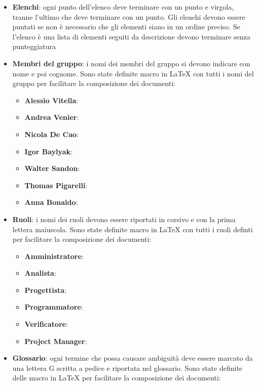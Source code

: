 \documentclass[12pt,a4paper]{article}
\begin{document}
\begin{itemize}
  \item \textbf{Elenchi}: ogni punto dell'elenco deve terminare con un punto e virgola, tranne l'ultimo che deve terminare con un punto. Gli elenchi devono essere puntati se non è necessario che gli elementi siano in un ordine preciso. Se l'elenco è una lista di elementi seguiti da descrizione devono terminare senza punteggiatura
  \item \textbf{Membri del gruppo}: i nomi dei membri del gruppo si devono indicare con nome e poi cognome. Sono state definite macro in \LaTeX{} con tutti i nomi del gruppo per facilitare la composizione dei documenti:
  \begin{itemize}
    \item \textbf{Alessio Vitella}: 
    \item \textbf{Andrea Venier}: 
    \item \textbf{Nicola De Cao}: 
    \item \textbf{Igor Baylyak}: 
    \item \textbf{Walter Sandon}: 
    \item \textbf{Thomas Pigarelli}: 
    \item \textbf{Anna Bonaldo}: 
  \end{itemize}
  \item \textbf{Ruoli}: i nomi dei ruoli devono essere riportati in corsivo e con la prima lettera maiuscola. Sono state definite macro in \LaTeX{} con tutti i ruoli definti per facilitare la composizione dei documenti:
  \begin{itemize}
    \item \textbf{Amministratore}: 
    \item \textbf{Analista}: 
    \item \textbf{Progettista}: 
    \item \textbf{Programmatore}: 
    \item \textbf{Verificatore}: 
    \item \textbf{Project Manager}: 
  \end{itemize}
  \item \textbf{Glossario}: ogni termine che possa causare ambiguità deve essere marcato da una lettera G scritta a pedice e riportata nel glossario. Sono state definite delle macro in \LaTeX{} per facilitare la composizione dei documenti:

\end{itemize}
\end{document}
